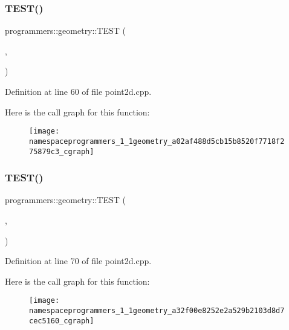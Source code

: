 \subsubsection{\texorpdfstring{T\+E\+S\+T()}{TEST()}\hspace{0.1cm}{\footnotesize\ttfamily [5/8]}}
{\footnotesize\ttfamily programmers\+::geometry\+::\+T\+E\+ST (\begin{DoxyParamCaption}\item[{Geometry\+Point2D}]{,  }\item[{GetX}]{ }\end{DoxyParamCaption})}



Definition at line 60 of file point2d.\+cpp.

Here is the call graph for this function\+:\nopagebreak
\begin{figure}[H]
\begin{center}
\leavevmode
\texttt{[image: namespaceprogrammers\_1\_1geometry\_a02af488d5cb15b8520f7718f275879c3\_cgraph]}
\end{center}
\end{figure}
\mbox{\label{namespaceprogrammers_1_1geometry_a32f00e8252e2a529b2103d8d7cec5160}} 
\subsubsection{\texorpdfstring{T\+E\+S\+T()}{TEST()}\hspace{0.1cm}{\footnotesize\ttfamily [6/8]}}
{\footnotesize\ttfamily programmers\+::geometry\+::\+T\+E\+ST (\begin{DoxyParamCaption}\item[{Geometry\+Point2D}]{,  }\item[{GetY}]{ }\end{DoxyParamCaption})}



Definition at line 70 of file point2d.\+cpp.

Here is the call graph for this function\+:\nopagebreak
\begin{figure}[H]
\begin{center}
\leavevmode
\texttt{[image: namespaceprogrammers\_1\_1geometry\_a32f00e8252e2a529b2103d8d7cec5160\_cgraph]}
\end{center}
\end{figure}
\mbox{\label{namespaceprogrammers_1_1geometry_a5eb75aca8d95b4268b677eb241ba7cce}} 
